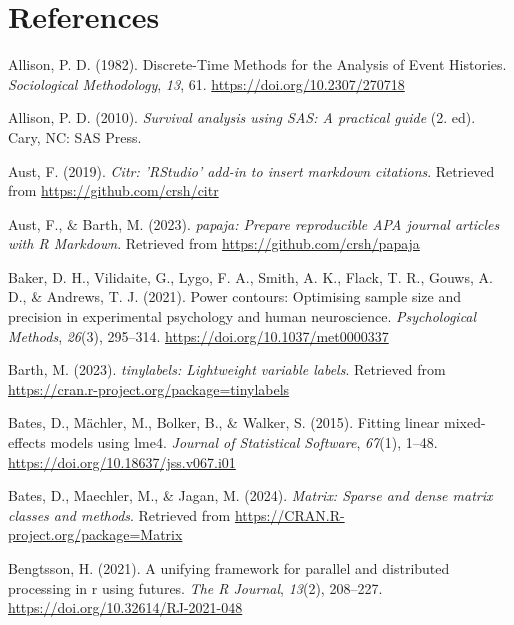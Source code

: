 \documentclass[
  man,floatsintext]{apa6}
\newlength{\cslhangindent}
\newenvironment{CSLReferences}[2] %
 {\begin{list}{}{%
  \setlength{\itemindent}{0pt}
  \setlength{\leftmargin}{0pt}
  \setlength{\parsep}{0pt}
  \ifodd #1
   \setlength{\leftmargin}{\cslhangindent}
   \setlength{\itemindent}{-1\cslhangindent}
  \fi
  \setlength{\itemsep}{#2\baselineskip}}}
 {\end{list}}
\begin{document}
\section{References}\label{references}

\label{refs}
\begin{CSLReferences}{1}{0}
Allison, P. D. (1982). Discrete-{Time Methods} for the {Analysis} of {Event Histories}. \emph{Sociological Methodology}, \emph{13}, 61. \url{https://doi.org/10.2307/270718}

Allison, P. D. (2010). \emph{Survival analysis using {SAS}: A practical guide} (2. ed). Cary, NC: SAS Press.

Aust, F. (2019). \emph{Citr: 'RStudio' add-in to insert markdown citations}. Retrieved from \url{https://github.com/crsh/citr}

Aust, F., \& Barth, M. (2023). \emph{{papaja}: {Prepare} reproducible {APA} journal articles with {R Markdown}}. Retrieved from \url{https://github.com/crsh/papaja}

Baker, D. H., Vilidaite, G., Lygo, F. A., Smith, A. K., Flack, T. R., Gouws, A. D., \& Andrews, T. J. (2021). Power contours: {Optimising} sample size and precision in experimental psychology and human neuroscience. \emph{Psychological Methods}, \emph{26}(3), 295--314. \url{https://doi.org/10.1037/met0000337}

Barth, M. (2023). \emph{{tinylabels}: Lightweight variable labels}. Retrieved from \url{https://cran.r-project.org/package=tinylabels}

Bates, D., Mächler, M., Bolker, B., \& Walker, S. (2015). Fitting linear mixed-effects models using {lme4}. \emph{Journal of Statistical Software}, \emph{67}(1), 1--48. \url{https://doi.org/10.18637/jss.v067.i01}

Bates, D., Maechler, M., \& Jagan, M. (2024). \emph{Matrix: Sparse and dense matrix classes and methods}. Retrieved from \url{https://CRAN.R-project.org/package=Matrix}

Bengtsson, H. (2021). A unifying framework for parallel and distributed processing in r using futures. \emph{The R Journal}, \emph{13}(2), 208--227. \url{https://doi.org/10.32614/RJ-2021-048}


\end{CSLReferences}
\end{document}
